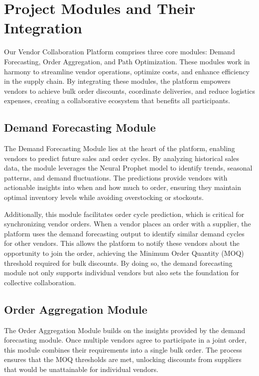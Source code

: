 \section{Project Modules and Their Integration}

Our Vendor Collaboration Platform comprises three core modules: Demand Forecasting, Order Aggregation, and Path Optimization. These modules work in harmony to streamline vendor operations, optimize costs, and enhance efficiency in the supply chain. By integrating these modules, the platform empowers vendors to achieve bulk order discounts, coordinate deliveries, and reduce logistics expenses, creating a collaborative ecosystem that benefits all participants.

\subsection{Demand Forecasting Module}

The Demand Forecasting Module lies at the heart of the platform, enabling vendors to predict future sales and order cycles. By analyzing historical sales data, the module leverages the Neural Prophet model to identify trends, seasonal patterns, and demand fluctuations. The predictions provide vendors with actionable insights into when and how much to order, ensuring they maintain optimal inventory levels while avoiding overstocking or stockouts.

Additionally, this module facilitates order cycle prediction, which is critical for synchronizing vendor orders. When a vendor places an order with a supplier, the platform uses the demand forecasting output to identify similar demand cycles for other vendors. This allows the platform to notify these vendors about the opportunity to join the order, achieving the Minimum Order Quantity (MOQ) threshold required for bulk discounts. By doing so, the demand forecasting module not only supports individual vendors but also sets the foundation for collective collaboration.

\subsection{Order Aggregation Module}

The Order Aggregation Module builds on the insights provided by the demand forecasting module. Once multiple vendors agree to participate in a joint order, this module combines their requirements into a single bulk order. The process ensures that the MOQ thresholds are met, unlocking discounts from suppliers that would be unattainable for individual vendors.

